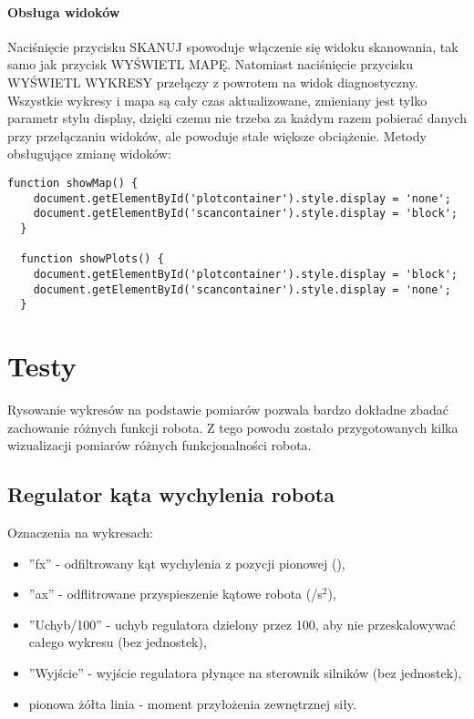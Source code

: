 \documentclass[a4paper,12pt,twoside,openany]{report}
\begin{document}
\subsubsection{Obsługa widoków}

Naciśnięcie przycisku SKANUJ spowoduje włączenie się widoku skanowania, tak samo jak przycisk WYŚWIETL MAPĘ. Natomiast naciśnięcie przycisku WYŚWIETL WYKRESY przełączy z powrotem na widok diagnostyczny. Wszystkie wykresy i mapa są cały czas aktualizowane, zmieniany jest tylko parametr stylu display, dzięki czemu nie trzeba za każdym razem pobierać danych przy przełączaniu widoków, ale powoduje stałe większe obciążenie. Metody obsługujące zmianę widoków:\\

\begin{lstlisting}[style=customhtml]
  function showMap() {
	document.getElementById('plotcontainer').style.display = 'none';
	document.getElementById('scancontainer').style.display = 'block';
  }
  
  function showPlots() {
	document.getElementById('plotcontainer').style.display = 'block';
	document.getElementById('scancontainer').style.display = 'none';
  }
\end{lstlisting}

\chapter{Testy}

Rysowanie wykresów na podstawie pomiarów pozwala bardzo dokładne zbadać zachowanie różnych funkcji robota. Z tego powodu zostało przygotowanych kilka wizualizacji pomiarów różnych funkcjonalności robota.

\section{Regulator kąta wychylenia robota}

\noindent Oznaczenia na wykresach:
\begin{itemize}
\item ''fx'' - odfiltrowany kąt wychylenia z pozycji pionowej (\textdegree),
\item ''ax'' - odflitrowane przyspieszenie kątowe robota (\textdegree/s$^2$),
\item ''Uchyb/100'' - uchyb regulatora dzielony przez 100, aby nie przeskalowywać całego wykresu (bez jednostek),
\item ''Wyjście'' - wyjście regulatora płynące na sterownik silników (bez jednostek),
\item pionowa żółta linia - moment przyłożenia zewnętrznej siły.
\end{itemize}
\end{document}
